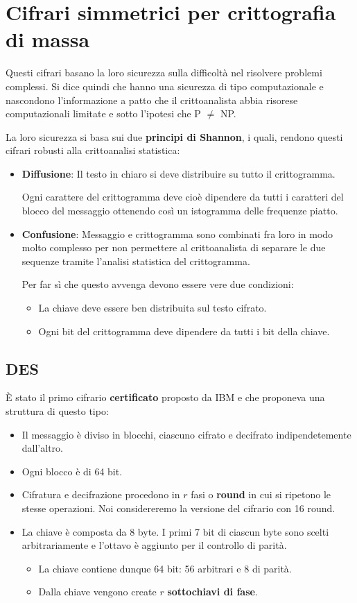 \chapter{Cifrari simmetrici per crittografia di massa}\label{critto_sim_massa}
Questi cifrari basano la loro sicurezza sulla difficolt\`a nel risolvere problemi complessi. Si dice quindi che hanno
una sicurezza di tipo computazionale e nascondono l'informazione a patto che il crittoanalista abbia risorese
computazionali limitate e sotto l'ipotesi che P $\neq$ NP.

La loro sicurezza si basa sui due \textbf{principi di Shannon}, i quali, rendono questi cifrari robusti alla
crittoanalisi statistica:
\begin{itemize}
	\item \textbf{Diffusione}: Il testo in chiaro si deve distribuire su tutto il crittogramma.

	      Ogni carattere del crittogramma deve cio\`e dipendere da tutti i caratteri del blocco del messaggio ottenendo
	      cos\`i un istogramma delle frequenze piatto.
	\item \textbf{Confusione}: Messaggio e crittogramma sono combinati fra loro in modo molto complesso per non
	      permettere al crittoanalista di separare le due sequenze tramite l'analisi statistica del crittogramma.

	      Per far s\`i che questo avvenga devono essere vere due condizioni:
	      \begin{itemize}
		      \item La chiave deve essere ben distribuita sul testo cifrato.
		      \item Ogni bit del crittogramma deve dipendere da tutti i bit della chiave.
	      \end{itemize}
\end{itemize}

\section{DES}\label{DES}
\`E stato il primo cifrario \textbf{certificato} proposto da IBM e che proponeva una struttura di questo tipo:
\begin{itemize}
	\item Il messaggio \`e diviso in blocchi, ciascuno cifrato e decifrato indipendetemente dall'altro.
	\item Ogni blocco \`e di 64 bit.
	\item Cifratura e decifrazione procedono in $r$ fasi o \textbf{round} in cui si ripetono le stesse operazioni. Noi
	      considereremo la versione del cifrario con 16 round.
	\item La chiave \`e composta da 8 byte. I primi 7 bit di ciascun byte sono scelti arbitrariamente e l'ottavo \`e
	      aggiunto per il controllo di parit\`a.
	      \begin{itemize}
		      \item La chiave contiene dunque 64 bit: 56 arbitrari e 8 di parit\`a.
		      \item Dalla chiave vengono create $r$ \textbf{sottochiavi di fase}.
	      \end{itemize}
\end{itemize}

